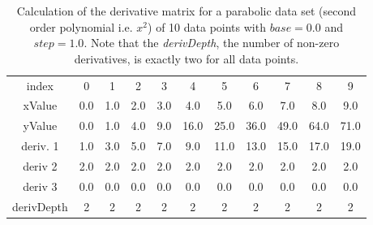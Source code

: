 \documentclass[main.tex]{subfiles}
\begin{document}
  
  \begin{table}[h]
    \caption{Calculation of the derivative matrix for a parabolic data set (second order polynomial i.e. $x^2$) of 10 data points with $base=0.0$ and $step=1.0$. Note that the \textit{derivDepth}, the number of non-zero derivatives, is exactly two for all data points.}
    \centering
    \begin{tabular}{ c | c c c c c c c c c c }
      index & 0 & 1 & 2 & 3 & 4 & 5 & 6 & 7 & 8 & 9 \\
      xValue & 0.0 & 1.0 & 2.0 & 3.0 & 4.0 & 5.0 & 6.0 & 7.0 & 8.0 & 9.0 \\
      \hline \hline
      yValue & 0.0 & 1.0 & 4.0 & 9.0 & 16.0 & 25.0 & 36.0 &  49.0 & 64.0 & 71.0 \\
      \hline
      deriv. 1 & 1.0 & 3.0 & 5.0 & 7.0 & 9.0 & 11.0 & 13.0 & 15.0 & 17.0 & 19.0 \\
      deriv 2 & 2.0 & 2.0 & 2.0 & 2.0 & 2.0 & 2.0 & 2.0 & 2.0 & 2.0 & 2.0 \\
      deriv 3 & 0.0 & 0.0 & 0.0 & 0.0 & 0.0 & 0.0 & 0.0 & 0.0 & 0.0 & 0.0 \\   
      \hline
      derivDepth & 2 & 2 & 2 & 2 & 2 & 2 & 2 & 2 & 2 & 2 \\   
    \end{tabular}
    \label{tbl:mtrx:simple}
  \end{table}
  
\end{document}
